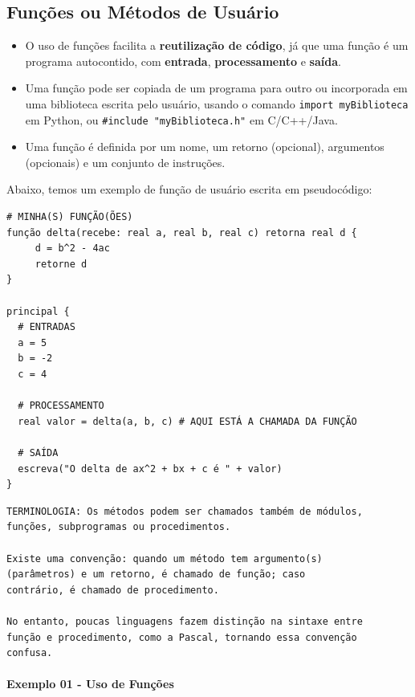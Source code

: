 \documentclass[12pt,a4paper]{article}
\begin{document}
    \hypertarget{funuxe7uxf5es-ou-muxe9todos-de-usuuxe1rio}{%
\subsection{Funções ou Métodos de
Usuário}\label{funuxe7uxf5es-ou-muxe9todos-de-usuuxe1rio}}

    \begin{itemize}
\item
  O uso de funções facilita a \textbf{reutilização de código}, já que
  uma função é um programa autocontido, com \textbf{entrada},
  \textbf{processamento} e \textbf{saída}.
\item
  Uma função pode ser copiada de um programa para outro ou incorporada
  em uma biblioteca escrita pelo usuário, usando o comando
  \texttt{import\ myBiblioteca} em Python, ou
  \texttt{\#include\ "myBiblioteca.h"} em C/C++/Java.
\item
  Uma função é definida por um nome, um retorno (opcional), argumentos
  (opcionais) e um conjunto de instruções.
\end{itemize}

Abaixo, temos um exemplo de função de usuário escrita em pseudocódigo:

    \begin{verbatim}
# MINHA(S) FUNÇÃO(ÕES)
função delta(recebe: real a, real b, real c) retorna real d {
     d = b^2 - 4ac
     retorne d
}

principal {
  # ENTRADAS
  a = 5
  b = -2
  c = 4

  # PROCESSAMENTO
  real valor = delta(a, b, c) # AQUI ESTÁ A CHAMADA DA FUNÇÃO
  
  # SAÍDA
  escreva("O delta de ax^2 + bx + c é " + valor)
}
\end{verbatim}

    \begin{verbatim}
TERMINOLOGIA: Os métodos podem ser chamados também de módulos,
funções, subprogramas ou procedimentos.

Existe uma convenção: quando um método tem argumento(s)
(parâmetros) e um retorno, é chamado de função; caso
contrário, é chamado de procedimento.

No entanto, poucas linguagens fazem distinção na sintaxe entre
função e procedimento, como a Pascal, tornando essa convenção
confusa.
\end{verbatim}

    \hypertarget{exemplo-01---uso-de-funuxe7uxf5es}{%
\paragraph{Exemplo 01 - Uso de
Funções}\label{exemplo-01---uso-de-funuxe7uxf5es}}
\end{document}
